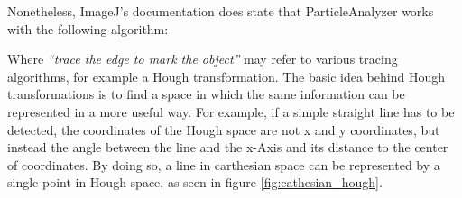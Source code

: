 \documentclass[a4paper, 12pt]{article}
\begin{document}
Nonetheless, ImageJ's documentation does state that ParticleAnalyzer works with
the following algorithm:

\begin{center}
\noindent{}
\end{center}

Where \textit{``trace the edge to mark the object''} may refer to various
tracing algorithms, for example a Hough transformation. The basic idea behind
Hough transformations is to find a space in which the same information can be
represented in a more useful way. For example, if a simple straight line has to
be detected, the coordinates of the Hough space are not x and y coordinates, but
instead the angle between the line and the x-Axis and its distance to the
center of coordinates. By doing so, a line in carthesian space can be
represented by a single point in Hough space, as seen in figure 
\ref{fig:cathesian_hough}.
\end{document}
